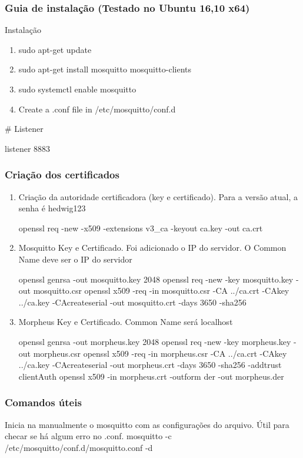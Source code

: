 \subsubsection{Guia de instalação (Testado no Ubuntu 16,10 x64)}
Instalação
\begin{enumerate}
\item sudo apt-get update
\item sudo apt-get install mosquitto mosquitto-clients
\item sudo systemctl enable mosquitto
\item Create a .conf file in /etc/mosquitto/conf.d
\end{enumerate}

\# Listener

listener 8883

\subsubsection{Criação dos certificados}

\begin{enumerate}
\item
Criação da autoridade certificadora (key e certificado). Para a versão atual, a senha é hedwig123

openssl req -new -x509 -extensions v3\_ca -keyout ca.key -out ca.crt
\item
Mosquitto Key e Certificado. Foi adicionado o IP do servidor. O Common Name deve ser o IP do servidor

openssl genrsa -out mosquitto.key 2048
openssl req -new -key mosquitto.key -out mosquitto.csr
openssl x509 -req -in mosquitto.csr -CA ../ca.crt -CAkey ../ca.key -CAcreateserial -out mosquitto.crt -days 3650 -sha256
\item
Morpheus Key e Certificado. Common Name será localhost

openssl genrsa -out morpheus.key 2048
openssl req -new -key morpheus.key -out morpheus.csr
openssl x509 -req -in morpheus.csr -CA ../ca.crt -CAkey ../ca.key -CAcreateserial -out morpheus.crt -days 3650 -sha256 -addtrust clientAuth
openssl x509 -in morpheus.crt -outform der -out morpheus.der
\end{enumerate}

\subsubsection{Comandos úteis}
Inicia na manualmente o mosquitto com as configurações do arquivo. Útil para checar se há algum erro no .conf.
mosquitto -c /etc/mosquitto/conf.d/mosquitto.conf -d

